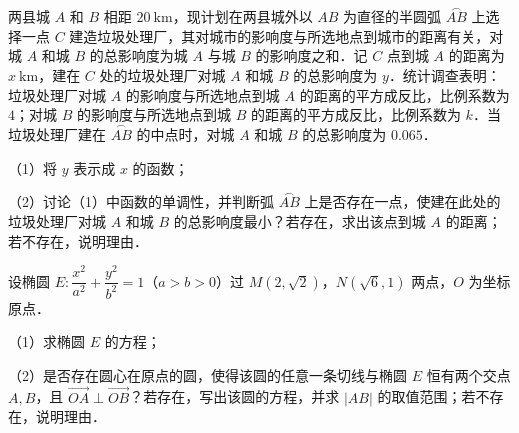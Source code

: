 \begin{question}
两县城 $A$ 和 $B$ 相距 $20\ \mathrm{km}$，现计划在两县城外以 $AB$ 为直径的半圆弧 $\overset{\frown}{AB}$ 上选择一点 $C$ 建造垃圾处理厂，其对城市的影响度与所选地点到城市的距离有关，对城 $A$ 和城 $B$ 的总影响度为城 $A$ 与城 $B$ 的影响度之和．记 $C$ 点到城 $A$ 的距离为 $x\ \mathrm{km}$，建在 $C$ 处的垃圾处理厂对城 $A$ 和城 $B$ 的总影响度为 $y$．统计调查表明：垃圾处理厂对城 $A$ 的影响度与所选地点到城 $A$ 的距离的平方成反比，比例系数为 $4$；对城 $B$ 的影响度与所选地点到城 $B$ 的距离的平方成反比，比例系数为 $k$．当垃圾处理厂建在 $\overset{\frown}{AB}$ 的中点时，对城 $A$ 和城 $B$ 的总影响度为 $0.065$．

（1）将 $y$ 表示成 $x$ 的函数；

（2）讨论（1）中函数的单调性，并判断弧 $\overset{\frown}{AB}$ 上是否存在一点，使建在此处的垃圾处理厂对城 $A$ 和城 $B$ 的总影响度最小？若存在，求出该点到城 $A$ 的距离；若不存在，说明理由．

\end{question}
\begin{question}
设椭圆 $E:\dfrac{x^2}{a^2}+\dfrac{y^2}{b^2}=1$（$a>b>0$）过 $M(2,\sqrt2)$，$N(\sqrt6,1)$ 两点，$O$ 为坐标原点．

（1）求椭圆 $E$ 的方程；

（2）是否存在圆心在原点的圆，使得该圆的任意一条切线与椭圆 $E$ 恒有两个交点 $A,B$，且 $\overrightarrow{OA}\perp\overrightarrow{OB}$？若存在，写出该圆的方程，并求 $|AB|$ 的取值范围；若不存在，说明理由．

\end{question}